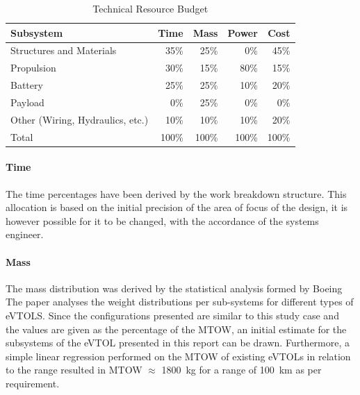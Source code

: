 \begin{table}[H]
\centering
\caption{Technical Resource Budget}
\begin{tabular}{lrrrr}
\hline
\textbf{Subsystem}                & \textbf{Time} & \textbf{Mass} & \textbf{Power} & \textbf{Cost} \\ \hline
Structures and Materials          & 35\% \cite{ProjectPlan}           & 25\% \cite{boeingMass}           & 0\%              & 45\%  \cite{purdue_cesun}          \\ 
Propulsion                        & 30\% \cite{ProjectPlan}              & 15\%  \cite{boeingMass}          & 80\%             & 15\% \cite{purdue_cesun}            \\ 
Battery                           & 25\%  \cite{ProjectPlan}            & 25\%  \cite{boeingMass}          & 10\%             &          20\% \cite{purdue_cesun}     \\ 
Payload                           & 0\%             & 25\%            & 0\%              & 0\%             \\ 
Other (Wiring,   Hydraulics, etc.) & 10\% \cite{ProjectPlan}              & 10\%            & 10\%             &          20\%     \\
Total                             & 100\%           & 100\%           & 100\%            & 100\%           \\ \hline
\end{tabular}
\label{tab:techbudget}
\end{table}

\vspace{-5mm}
\paragraph{Time} The time percentages have been derived by the work breakdown structure.
This allocation is based on the initial precision of the area of focus of the design, it is however possible for it to be changed, with the accordance of the systems engineer.
\vspace{-5mm}
\paragraph{Mass} The mass distribution was derived by the statistical analysis formed by Boeing~\cite{boeingMass} The paper analyses the weight distributions per sub-systems for different types of eVTOLS. Since the configurations presented are similar to this study case and the values are given as the percentage of the MTOW, an initial estimate for the subsystems of the eVTOL presented in this report can be drawn.
  Furthermore, a simple linear regression performed on the MTOW of existing eVTOLs in relation to the range resulted in MTOW $\approx$ \qty{1800}{kg} for a range of \qty{100}{km} as per requirement.
\vspace{-5mm}

